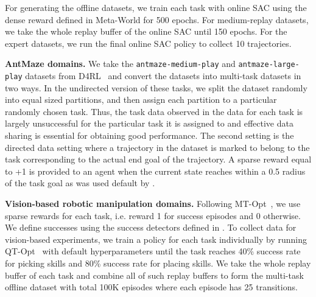 For generating the offline datasets, we train each task with online SAC using the dense reward defined in Meta-World for 500 epochs. For medium-replay datasets, we take the whole replay buffer of the online SAC until 150 epochs. For the expert datasets, we run the final online SAC policy to collect 10 trajectories.

\textbf{AntMaze domains.} We take the \texttt{antmaze-medium-play} and \texttt{antmaze-large-play} datasets from D4RL~\citep{fu2020d4rl} and convert the datasets into multi-task datasets in two ways. In the undirected version of these tasks, we split the dataset randomly into equal sized partitions, and then assign each partition to a particular randomly chosen task. Thus, the task data observed in the data for each task is largely unsuccessful for the particular task it is assigned to and effective data sharing is essential for obtaining good performance. The second setting is the directed data setting where a trajectory in the dataset is marked to belong to the task corresponding to the actual end goal of the trajectory. A sparse reward equal to +1 is provided to an agent when the current state reaches within a 0.5 radius of the task goal as was used default by \citet{fu2020d4rl}. 

\textbf{Vision-based robotic manipulation domains.} Following MT-Opt~\citep{kalashnikov2021mt}, we use sparse rewards for each task, i.e. reward 1 for success episodes and 0 otherwise. We define successes using the success detectors defined in \citep{kalashnikov2021mt}. 
To collect data for vision-based experiments, we train a policy for each task individually by running QT-Opt~\citep{kalashnikov2018scalable} with default hyperparameters until the task reaches 40\% success rate for picking skills and 80\% success rate for placing skills. We take the whole replay buffer of each task and combine all of such replay buffers to form the multi-task offline dataset with total 100K episodes where each episode has 25 transitions.



